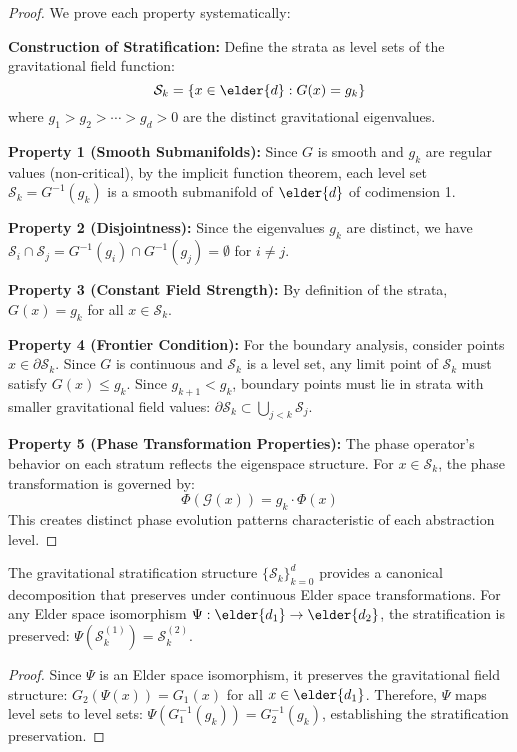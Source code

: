 \begin{proof}
We prove each property systematically:

\textbf{Construction of Stratification:}
Define the strata as level sets of the gravitational field function:
$$\mathcal{S}_k = \{x \in \elder{d} : G(x) = g_k\}$$
where $g_1 > g_2 > \cdots > g_d > 0$ are the distinct gravitational eigenvalues.

\textbf{Property 1 (Smooth Submanifolds):}
Since $G$ is smooth and $g_k$ are regular values (non-critical), by the implicit function theorem, each level set $\mathcal{S}_k = G^{-1}(g_k)$ is a smooth submanifold of $\elder{d}$ of codimension 1.

\textbf{Property 2 (Disjointness):}
Since the eigenvalues $g_k$ are distinct, we have $\mathcal{S}_i \cap \mathcal{S}_j = G^{-1}(g_i) \cap G^{-1}(g_j) = \emptyset$ for $i \neq j$.

\textbf{Property 3 (Constant Field Strength):}
By definition of the strata, $G(x) = g_k$ for all $x \in \mathcal{S}_k$.

\textbf{Property 4 (Frontier Condition):}
For the boundary analysis, consider points $x \in \partial \mathcal{S}_k$. Since $G$ is continuous and $\mathcal{S}_k$ is a level set, any limit point of $\mathcal{S}_k$ must satisfy $G(x) \leq g_k$. Since $g_{k+1} < g_k$, boundary points must lie in strata with smaller gravitational field values: $\partial \mathcal{S}_k \subset \bigcup_{j < k} \mathcal{S}_j$.

\textbf{Property 5 (Phase Transformation Properties):}
The phase operator's behavior on each stratum reflects the eigenspace structure. For $x \in \mathcal{S}_k$, the phase transformation is governed by:
$$\Phi(\mathcal{G}(x)) = g_k \cdot \Phi(x)$$
This creates distinct phase evolution patterns characteristic of each abstraction level.
\end{proof}

\begin{corollary}
The gravitational stratification structure $\{\mathcal{S}_k\}_{k=0}^d$ provides a canonical decomposition that preserves under continuous Elder space transformations. For any Elder space isomorphism $\Psi: \elder{d_1} \rightarrow \elder{d_2}$, the stratification is preserved: $\Psi(\mathcal{S}_k^{(1)}) = \mathcal{S}_k^{(2)}$.
\end{corollary}

\begin{proof}
Since $\Psi$ is an Elder space isomorphism, it preserves the gravitational field structure: $G_2(\Psi(x)) = G_1(x)$ for all $x \in \elder{d_1}$. Therefore, $\Psi$ maps level sets to level sets: $\Psi(G_1^{-1}(g_k)) = G_2^{-1}(g_k)$, establishing the stratification preservation.
\end{proof}

